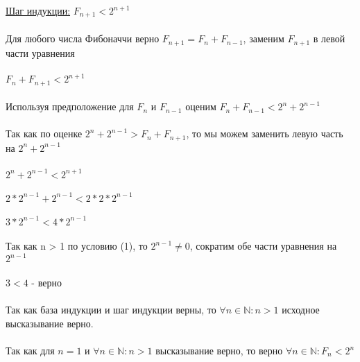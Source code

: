 \documentclass[12pt, a4paper]{article}
\begin{document}
	\underline{Шаг индукции:} $F_{n + 1} < 2^{n + 1}$\\
	\\
	Для любого числа Фибоначчи верно $F_{n + 1} = F_{n} + F_{n - 1}$, заменим $F_{n + 1}$ в левой части уравнения\\
	\\
	$F_{n} + F_{n + 1} < 2^{n + 1}$\\
	\\
	Используя предположение для $F_{n}$ и $F_{n - 1}$ оценим $F_{n} + F_{n - 1} < 2 ^ n + 2^{n - 1}$\\
	\\
	Так как по оценке $ 2 ^ n + 2^{n - 1} > F_n  + F_{n + 1}$, то мы можем заменить левую часть на $ 2 ^ n + 2^{n - 1}$\\
	\\
	$ 2 ^ n + 2^{n - 1} < 2 ^ {n + 1}$\\
	\\
	$2 * 2^{n - 1} + 2^{n - 1} < 2 * 2 * 2^{n - 1}$\\
	\\
	$3 * 2^{n - 1} < 4 * 2^{n - 1}$\\
	\\
	Так как n > 1 по условию (1), то $2^{n - 1} \neq 0$, сократим обе части уравнения на $2^{n - 1}$\\
	\\
	$3 < 4$ - верно\\
	\\
	Так как база индукции и шаг индукции верны, то $\forall n \in \mathbb{N}: n > 1$ исходное высказывание верно.\\
	\\
	Так как для $n = 1$  и  $\forall n \in \mathbb{N}: n > 1$ высказывание верно, то верно $\forall n \in \mathbb{N}: F_n < 2 ^ n$
\end{document}
